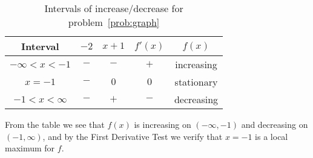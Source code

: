\documentclass{article}
\begin{document}
\begin{enumerate}
\begin{enumerate}
\begin{table}[htbp]
      \begin{tabular}{|c|c|c|c|c|}
        \hline
        Interval       & $-2$ & $x+1$ & $f'(x)$ & $f(x)$ 
        \\ \hline
        $-\infty<x<-1$ & $-$  & $-$   & $+$     & increasing 
        \\ \hline
        $x=-1$         & $-$  & $0$   & $0$     & stationary
        \\ \hline
        $-1<x<\infty$  & $-$  & $+$   & $-$     & decreasing
        \\ \hline
      \end{tabular}
      \caption{Intervals of increase/decrease for problem~\ref{prob:graph}}
      \label{tab:crit}
    \end{table}
    From the table we see that $f(x)$ is increasing on $(-\infty,-1)$ and
    decreasing on $(-1,\infty)$, and by the First Derivative Test
    we verify that $x=-1$ is a local maximum for $f$.


\end{enumerate}
\end{enumerate}
\end{document}
